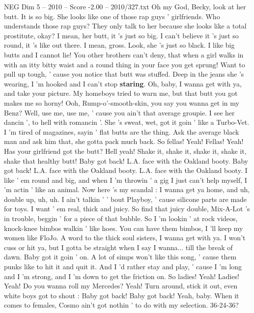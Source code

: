 \begin{textsample}{NEG Dim 5 – 2010 – Score -2.00 – 2010/327.txt}  \label{ex:f5_neg_001}
Oh my God, Becky, look at her butt.
It is so big.
She looks like one of those rap guys ' girlfriends.
Who understands those rap guys?
They only talk to her because she looks like a total prostitute, okay?
I mean, her butt, it 's just so big.
I can't believe it 's just so round, it 's like out there.
I mean, gross.
Look, she 's just so black.
I like big butts and I cannot lie!
You other brothers can't deny, that when a girl walks in with an itty bitty waist and a round thing in your face you get sprung!
Want to pull up tough, ' cause you notice that butt was stuffed.
Deep in the jeans she 's wearing, I 'm hooked and I can't stop \textbf{staring}.
Oh, baby, I wanna get with ya, and take your picture.
My homeboys tried to warn me, but that butt you got makes me so horny!
Ooh, Rump-o'-smooth-skin, you say you wanna get in my Benz?
Well, use me, use me, ' cause you ain't that average groupie.
I see her dancin ', to hell with romancin '.
She 's sweat, wet, got it goin ' like a Turbo-Vet.
I 'm tired of magazines, sayin ' flat butts are the thing.
Ask the average black man and ask him that, she gotta pack much back.
So fellas!
Yeah!
Fellas!
Yeah!
Has your girlfriend got the butt?
Hell yeah!
Shake it, shake it, shake it, shake it, shake that healthy butt!
Baby got back!
L.A. face with the Oakland booty.
Baby got back!
L.A. face with the Oakland booty.
L.A. face with the Oakland booty.
I like ' em round and big, and when I 'm throwin ' a gig I just can't help myself, I 'm actin ' like an animal.
Now here 's my scandal : I wanna get ya home, and uh, double up, uh, uh.
I ain't talkin ' ' bout Playboy, ' cause silicone parts are made for toys.
I want ' em real, thick and juicy.
So find that juicy double, Mix-A-Lot 's in trouble, beggin ' for a piece of that bubble.
So I 'm lookin ' at rock videos, knock-knee bimbos walkin ' like hoes.
You can have them bimbos, I 'll keep my women like FloJo.
A word to the thick soul sisters, I wanna get with ya.
I won't cuss or hit ya, but I gotta be straight when I say I wanna... till the break of dawn.
Baby got it goin ' on.
A lot of simps won't like this song, ' cause them punks like to hit it and quit it.
And I 'd rather stay and play, ' cause I 'm long and I 'm strong, and I 'm down to get the friction on.
So ladies!
Yeah!
Ladies!
Yeah!
Do you wanna roll my Mercedes?
Yeah!
Turn around, stick it out, even white boys got to shout : Baby got back!
Baby got back!
Yeah, baby.
When it comes to females, Cosmo ain't got nothin ' to do with my selection. 36-24-36?

\end{textsample}
